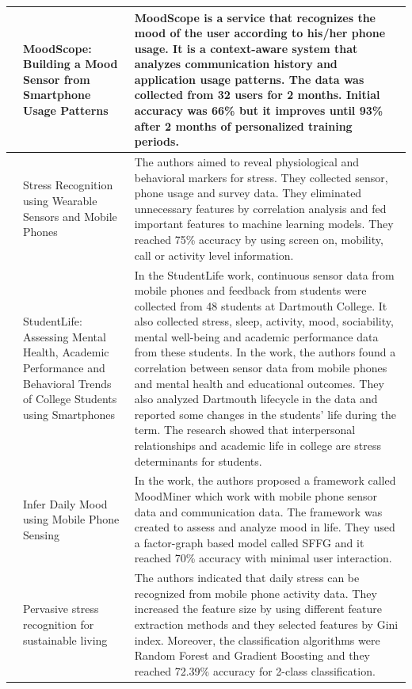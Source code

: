 \documentclass[12pt,oneandhalf,chaparabic,lfm,phd,eng,oneside,pntc]{gsufbe}
\begin{document}
\begin{longtable}[c]{| P{2cm} | P{3cm} | P{9cm} |}
\cite{likamwa2013moodscope} & MoodScope: Building a Mood Sensor from Smartphone Usage Patterns & MoodScope is a service that recognizes the mood of the user according to his/her phone usage. It is a context-aware system that analyzes communication history and application usage patterns. The data was collected from 32 users for 2 months. Initial accuracy was 66\% but it improves until 93\% after 2 months of personalized training periods. \\ \hline
\cite{sano2013stress} & Stress Recognition using Wearable Sensors and Mobile Phones & The authors aimed to reveal physiological and behavioral markers for stress. They collected sensor, phone usage and survey data. They eliminated unnecessary features by correlation analysis and fed important features to machine learning models. They reached 75\% accuracy by using screen on, mobility, call or activity level information. \\ \hline
\cite{wang2014studentlife} & StudentLife: Assessing Mental Health, Academic Performance and Behavioral Trends of College Students using Smartphones & In the StudentLife work, continuous sensor data from mobile phones and feedback from students were collected from 48 students at Dartmouth College. It also collected stress, sleep, activity, mood, sociability, mental well-being and academic performance data from these students. In the work, the authors found a correlation between sensor data from mobile phones and mental health and educational outcomes. They also analyzed Dartmouth lifecycle in the data and reported some changes in the students’ life during the term. The research showed that interpersonal relationships and academic life in college are stress determinants for students. \\ \hline
\cite{ma2014infer} & Infer Daily Mood using Mobile Phone Sensing & In the work, the authors proposed a framework called MoodMiner which work with mobile phone sensor data and communication data. The framework was created to assess and analyze mood in life. They used a factor-graph based model called SFFG and it reached 70\% accuracy with minimal user interaction. \\ \hline
\cite{bogomolov2014pervasive} & Pervasive stress recognition for sustainable living & The authors indicated that daily stress can be recognized from mobile phone activity data. They increased the feature size by using different feature extraction methods and they selected features by Gini index. Moreover, the classification algorithms were Random Forest and Gradient Boosting and they reached 72.39\% accuracy for 2-class classification. \\ \hline

\end{longtable}
\end{document}

